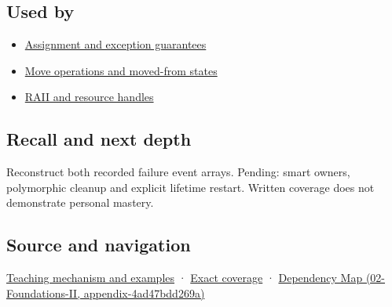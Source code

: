 \subsection{Used by}\label{appendix-9bfe377cef7a-used-by}

\begin{itemize}
\tightlist
\item
  \hyperref[appendix-bea6beb5350f]{Assignment and exception guarantees}
\item
  \hyperref[appendix-5636651017c2]{Move operations and moved-from states}
\item
  \hyperref[appendix-69739d3ab49b]{RAII and resource handles}
\end{itemize}

\subsection{Recall and next depth}\label{appendix-9bfe377cef7a-recall-and-next-depth}

Reconstruct both recorded failure event arrays. Pending: smart owners, polymorphic cleanup and explicit lifetime restart. Written coverage does not demonstrate personal mastery.

\subsection{Source and navigation}\label{appendix-9bfe377cef7a-source-and-navigation}

\hyperref[01-foundations-i-ch003-destruction-closes-the-ownership-interval]{Teaching mechanism and examples} · \hyperref[appendix-fd090d982a15-m009---parts-127-147]{Exact coverage} · \href{../02-Foundations-II/main.pdf\#nameddest=appendix-4ad47bdd269a}{Dependency Map (02-Foundations-II, appendix-4ad47bdd269a)}
